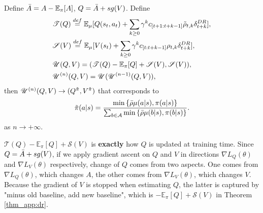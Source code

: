 \begin{Theorem_app}
    Define $\Bar{A} = A - \mathbb{E}_\pi[A]$, $Q = \Bar{A} + sg(V)$.
    Define $$
    \begin{aligned}
    &\mathscr{T}(Q) \overset{def}{=} \mathbb{E}_{\mu}   [
        Q(s_t, a_t) + \sum_{k \geq 0}  \gamma^k
        c_{[t+1:t+k-1]} \Tilde{\rho}_{t, k}
        \delta^{DR}_{t+k}
        ], \\
    &\mathscr{S}(V) \overset{def}{=} \mathbb{E}_{\mu}   [
        V(s_t) + \sum_{k \geq 0}  \gamma^k
        c_{[t:t+k-1]} \rho_{t, k}
        \delta^{DR}_{t+k}
        ], \\
    &\mathscr{U}(Q, V) = (\mathscr{T}(Q) - \mathbb{E}_\pi[Q] + \mathscr{S}(V), \mathscr{S}(V)), \\
    &\mathscr{U}^{(n)}(Q, V) = \mathscr{U}(\mathscr{U}^{(n-1)}(Q, V)),
    \end{aligned}
    $$
    then $\mathscr{U}^{(n)}(Q, V) \rightarrow (Q^{\Tilde{\pi}}, V^{\Tilde{\pi}})$ that corresponds to 
    $$
        \Tilde{\pi}(a|s) = \frac
        {\min \left\{\Bar{\rho} \mu (a|s), \pi(a|s)\right\}}
        {\sum_{b \in \mathcal{A}}\min \left\{\Bar{\rho} \mu (b|s), \pi(b|s)\right\}}.
    $$ as $n \rightarrow +\infty$.
\label{thm_app:dr}
\end{Theorem_app}
\begin{Remark_app}
$\mathscr{T}(Q) - \mathbb{E}_\pi[Q] + \mathscr{S}(V)$ is \textbf{exactly} how $Q$ is updated at training time. 
Since $Q = \Bar{A} + sg(V)$, if we apply gradient ascent on $Q$ and $V$ in directions $\nabla L_Q(\theta)$ and $\nabla L_V(\theta)$ respectively, change of $Q$ comes from two aspects. One comes from $\nabla L_Q(\theta)$, which changes $A$, the other comes from $\nabla L_V(\theta)$, which changes $V$. Because the gradient of $V$ is stopped when estimating $Q$, the latter is captured by "minus old baseline, add new baseline", which is $- \mathbb{E}_\pi[Q] + \mathscr{S}(V)$ in Theorem \ref{thm_app:dr}.
\end{Remark_app}

